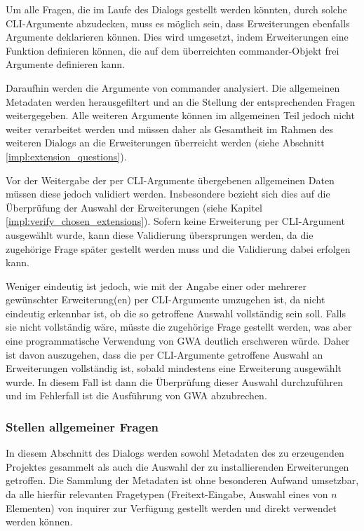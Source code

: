 Um alle Fragen, die im Laufe des Dialogs gestellt werden könnten, durch solche \gls{CLI}-Argumente abzudecken, muss es möglich sein, dass Erweiterungen ebenfalls Argumente deklarieren können. Dies wird umgesetzt, indem Erweiterungen eine Funktion definieren können, die auf dem überreichten commander-Objekt frei Argumente definieren kann.

Daraufhin werden die Argumente von commander analysiert. Die allgemeinen Metadaten werden herausgefiltert und an die Stellung der entsprechenden Fragen weitergegeben. Alle weiteren Argumente können im allgemeinen Teil jedoch nicht weiter verarbeitet werden und müssen daher als Gesamtheit im Rahmen des weiteren Dialogs an die Erweiterungen überreicht werden (siehe Abschnitt \ref{impl:extension_questions}).

Vor der Weitergabe der per \gls{CLI}-Argumente übergebenen allgemeinen Daten müssen diese jedoch validiert werden. Insbesondere bezieht sich dies auf die Überprüfung der Auswahl der Erweiterungen (siehe Kapitel \ref{impl:verify_chosen_extensions}). Sofern keine Erweiterung per \gls{CLI}-Argument ausgewählt wurde, kann diese Validierung übersprungen werden, da die zugehörige Frage später gestellt werden muss und die Validierung dabei erfolgen kann.

Weniger eindeutig ist jedoch, wie mit der Angabe einer oder mehrerer gewünschter Erweiterung(en) per \gls{CLI}-Argumente umzugehen ist, da nicht eindeutig erkennbar ist, ob die so getroffene Auswahl vollständig sein soll. Falls sie nicht vollständig wäre, müsste die zugehörige Frage gestellt werden, was aber eine programmatische Verwendung von \gls{GWA} deutlich erschweren würde. Daher ist davon auszugehen, dass die per \gls{CLI}-Argumente getroffene Auswahl an Erweiterungen vollständig ist, sobald mindestens eine Erweiterung ausgewählt wurde. In diesem Fall ist dann die Überprüfung dieser Auswahl durchzuführen und im Fehlerfall ist die Ausführung von \gls{GWA} abzubrechen.

\subsubsection{Stellen allgemeiner Fragen}
\label{impl:general_questions}
In diesem Abschnitt des Dialogs werden sowohl Metadaten des zu erzeugenden Projektes gesammelt als auch die Auswahl der zu installierenden Erweiterungen getroffen. Die Sammlung der Metadaten ist ohne besonderen Aufwand umsetzbar, da alle hierfür relevanten Fragetypen (Freitext-Eingabe, Auswahl eines von $n$ Elementen) von inquirer zur Verfügung gestellt werden und direkt verwendet werden können.

